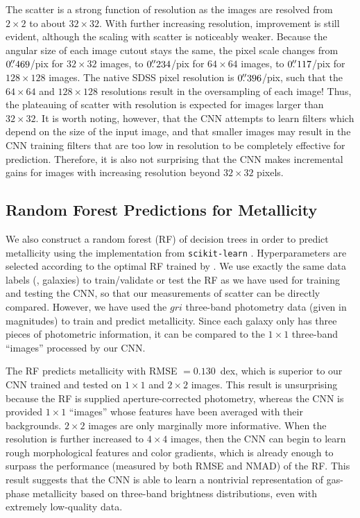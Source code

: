 \documentclass[fleqn,usenatbib]{mnras}
\begin{document}
The scatter is a strong function of resolution as the images are resolved from $2 \times 2$ to about $32 \times 32$. With further increasing resolution, improvement is still evident, although the scaling with scatter is noticeably weaker. Because the angular size of each image cutout stays the same, the pixel scale changes from $0\hbox{$.\!\!^{\prime\prime}$}469$/pix for $32 \times 32$ images, to $0\hbox{$.\!\!^{\prime\prime}$}234$/pix for $64 \times 64$ images, to $0\hbox{$.\!\!^{\prime\prime}$}117$/pix for $128 \times 128$ images. The native SDSS pixel resolution is $0\hbox{$.\!\!^{\prime\prime}$}396$/pix, such that the $64 \times 64$ and $128 \times 128$ resolutions result in the oversampling of each image! Thus, the plateauing of scatter with resolution is expected for images larger than $32 \times 32$. It is worth noting, however, that the CNN attempts to learn filters which depend on the size of the input image, and that smaller images may result in the CNN training filters that are too low in resolution to be completely effective for prediction. Therefore, it is also not surprising that the CNN makes incremental gains for images with increasing resolution beyond $32 \times 32$ pixels.

\subsection{Random Forest Predictions for Metallicity}
We also construct a random forest (RF) of decision trees in order to predict metallicity using the implementation from \texttt{scikit-learn} \citep{Pedregosa2012}. Hyperparameters are selected according to the optimal RF trained by \cite{Acquaviva2016}. We use exactly the same data labels (\ie, galaxies) to train/validate or test the RF as we have used for training and testing the CNN, so that our measurements of scatter can be directly compared. However, we have used the $gri$ three-band photometry data (given in magnitudes) to train and predict metallicity. Since each galaxy only has three pieces of photometric information, it can be compared to the $1 \times 1$ three-band ``images'' processed by our CNN.

The RF predicts metallicity with RMSE $= 0.130$~dex, which is superior to our CNN trained and tested on $1\times 1$ and $2 \times 2$ images.
This result is unsurprising because the RF is supplied aperture-corrected photometry, whereas the CNN is provided $1 \times 1 $ \sdssi\sdssr\sdssg ``images'' whose features have been averaged with their backgrounds. $2 \times 2$ images are only marginally more informative. When the resolution is further increased to $4 \times 4$ images, then the CNN can begin to learn rough morphological features and color gradients, which is already enough to surpass the performance (measured by both RMSE and NMAD) of the RF.
This result suggests that the CNN is able to learn a nontrivial representation of gas-phase metallicity based on three-band brightness distributions, even with extremely low-quality data.
\end{document}
